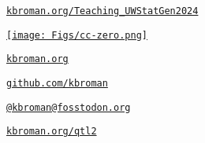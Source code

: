 \documentclass[aspectratio=169,12pt,t]{beamer}
\begin{document}
\begin{frame}[c]{}

\Large

\href{https://kbroman.org/Teaching_UWStatGen2024}{\tt kbroman.org/Teaching\_UWStatGen2024}

\vspace*{-7mm}
\hfill
\href{https://creativecommons.org/publicdomain/zero/1.0/}{\texttt{[image: Figs/cc-zero.png]}}

\vspace{3mm}

\href{https://kbroman.org}{\tt \lolit kbroman.org}

\vspace{4mm}

\href{https://github.com/kbroman}{\tt \lolit github.com/kbroman}

\vspace{4mm}

\href{https://fosstodon.org/@kbroman}{\tt \lolit @kbroman@fosstodon.org}

\vspace{4mm}

\href{https://kbroman.org/qtl2}{\tt \lolit kbroman.org/qtl2}





\end{frame}
\end{document}
